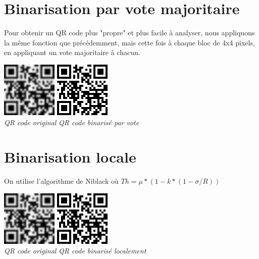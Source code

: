 \documentclass[a4paper,11pt]{article}
\begin{document}
\section{Binarisation par vote majoritaire}

Pour obtenir un QR code plus "propre" et plus facile à analyser, nous appliquons la même fonction que précédemment, mais cette fois à chaque bloc de 4x4 pixels, en appliquant un vote majoritaire à chacun.

\begin{center}
\includegraphics[scale=0.5]{./v2_4x4.png} \hspace{3cm}
\includegraphics[scale=0.5]{./v2binarise.png}\\
\textit{QR code original} \hspace{1.3cm} \textit{QR code binarisé par vote}
\end{center}

\section{Binarisation locale}

On utilise l'algorithme de Niblack où $Th = \mu *(1 - k *(1-\sigma/R))$

\begin{center}
\includegraphics[scale=0.5]{./v2_4x4.png} \hspace{3cm}
\includegraphics[scale=0.5]{./v2binarise.png}\\
 \hspace{0.5cm} \textit{QR code original} \hspace{1cm} \textit{QR code binarisé localement}
\end{center}
\end{document}

